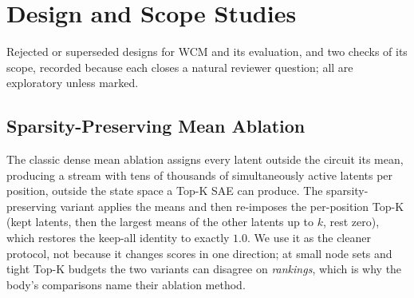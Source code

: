 \documentclass[10pt]{article}
\begin{document}
\section{Design and Scope Studies}
\label{app:membership-studies}
Rejected or superseded designs for WCM and its evaluation, and two checks of its scope, recorded because each closes a natural reviewer question; all are exploratory unless marked.


\subsection{Sparsity-Preserving Mean Ablation}
\label{app:respect-topk}
The classic dense mean ablation assigns every latent outside the circuit its mean, producing a stream with tens of thousands of simultaneously active latents per position, outside the state space a Top-K SAE can produce.
The sparsity-preserving variant applies the means and then re-imposes the per-position Top-K (kept latents, then the largest means of the other latents up to $k$, rest zero), which restores the keep-all identity to exactly $1.0$.
We use it as the cleaner protocol, not because it changes scores in one direction; at small node sets and tight Top-K budgets the two variants can disagree on \emph{rankings}, which is why the body's comparisons name their ablation method.

\end{document}
